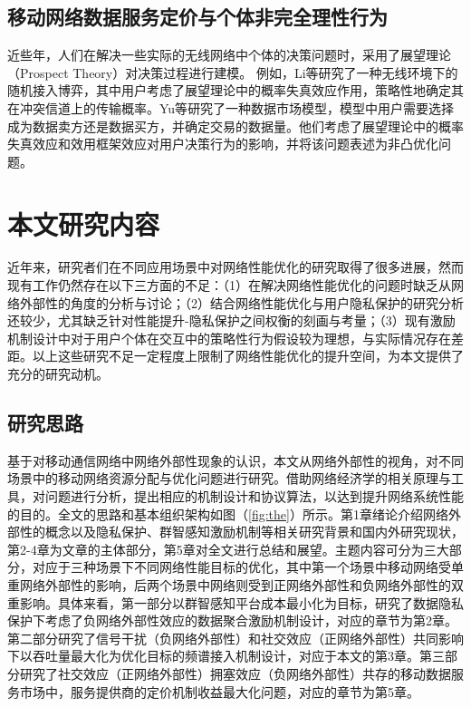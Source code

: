 \subsection{移动网络数据服务定价与个体非完全理性行为}
近些年，人们在解决一些实际的无线网络中个体的决策问题时，采用了展望理论（Prospect Theory）\cite{Kahneman}对决策过程进行建模。 例如，Li等\cite{Tianming}研究了一种无线环境下的随机接入博弈，其中用户考虑了展望理论中的{\kaishu 概率失真效应}作用，策略性地确定其在冲突信道上的传输概率。Yu等\cite{Yu}研究了一种数据市场模型，模型中用户需要选择成为数据卖方还是数据买方，并确定交易的数据量。他们考虑了展望理论中的{\kaishu 概率失真效应}和{\kaishu 效用框架效应}对用户决策行为的影响，并将该问题表述为非凸优化问题。

\section{本文研究内容}

近年来，研究者们在不同应用场景中对网络性能优化的研究取得了很多进展，然而现有工作仍然存在以下三方面的不足：（1）在解决网络性能优化的问题时缺乏从网络外部性的角度的分析与讨论；（2）结合网络性能优化与用户隐私保护的研究分析还较少，尤其缺乏针对性能提升-隐私保护之间权衡的刻画与考量；（3）现有激励机制设计中对于用户个体在交互中的策略性行为假设较为理想，与实际情况存在差距。以上这些研究不足一定程度上限制了网络性能优化的提升空间，为本文提供了充分的研究动机。

\subsection{研究思路}

基于对移动通信网络中网络外部性现象的认识，本文从网络外部性的视角，对不同场景中的移动网络资源分配与优化问题进行研究。借助网络经济学的相关原理与工具，对问题进行分析，提出相应的机制设计和协议算法，以达到提升网络系统性能的目的。全文的思路和基本组织架构如图（\ref{fig:the}）所示。第1章绪论介绍网络外部性的概念以及隐私保护、群智感知激励机制等相关研究背景和国内外研究现状，第2-4章为文章的主体部分，第5章对全文进行总结和展望。主题内容可分为三大部分，对应于三种场景下不同网络性能目标的优化，其中第一个场景中移动网络受单重网络外部性的影响，后两个场景中网络则受到正网络外部性和负网络外部性的双重影响。具体来看，第一部分以群智感知平台成本最小化为目标，研究了数据隐私保护下考虑了{\kaishu 负网络外部性}效应的数据聚合激励机制设计，对应的章节为第2章。第二部分研究了信号干扰（{\kaishu 负网络外部性}）和社交效应（{\kaishu 正网络外部性}）共同影响下以吞吐量最大化为优化目标的频谱接入机制设计，对应于本文的第3章。第三部分研究了社交效应（{\kaishu 正网络外部性}）拥塞效应（{\kaishu 负网络外部性}）共存的移动数据服务市场中，服务提供商的定价机制收益最大化问题，对应的章节为第5章。

